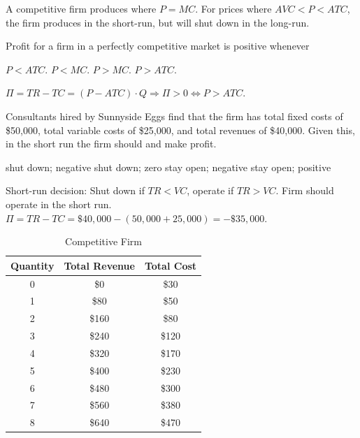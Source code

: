 \documentclass[addpoints,11pt]{exam}
\theoremstyle{definition}
\newcommand{\blank}[0]{\underline{\hspace{3cm}}}
\begin{document}
\begin{questions}
			\begin{solution}
				A competitive firm produces where $P = MC$. For prices where $AVC < P < ATC$, the firm produces in the short-run, but will shut down in the long-run.
			\end{solution}
	
		
		\question Profit for a firm in a perfectly competitive market is positive whenever
		
		\begin{choices}
			\choice $P < ATC$.
			\choice  $P < MC$.
			\choice $P > MC$.
			\CorrectChoice $P >ATC$.
		\end{choices}
		
		\begin{solution}
			$\Pi = TR - TC  = (P - ATC)\cdot Q \Rightarrow \Pi >0 \iff P > ATC$.
		\end{solution}
	
		\question Consultants hired by Sunnyside Eggs find that the firm has total fixed costs of \$50,000, total variable costs of \$25,000, and total revenues of \$40,000. Given this, in the short run the firm should \blank and make \blank profit.
		
		\begin{choices}
			\choice shut down; negative
			\choice shut down; zero
			\CorrectChoice stay open; negative
			\choice stay open; positive
		\end{choices}
	
			
		\begin{solution}
			Short-run decision: Shut down if $TR<VC$, operate if $TR>VC$. Firm should operate in the short run. $\Pi = TR - TC = \$40,000 - (50,000 + 25,000) = -\$35,000.$
		\end{solution}
		
				\begin{table}[H]
							\centering
							\caption{Competitive Firm}
							\label{tab2}
							\begin{tabular}{ c|c|c}        
								
								Quantity & Total Revenue & Total Cost  \\
								\hline
								0 & \$0  & \$30 \\
								1 & \$80 & \$50 \\
								2 & \$160 & \$80 \\
								3 & \$240 & \$120 \\
								4 & \$320 & \$170  \\
								5 & \$400 & \$230 \\
								6 & \$480 & \$300  \\
								7 & \$560 & \$380 \\
								8 & \$640 & \$470   \\
							\end{tabular}
						\end{table} 


\end{questions}
\end{document}
